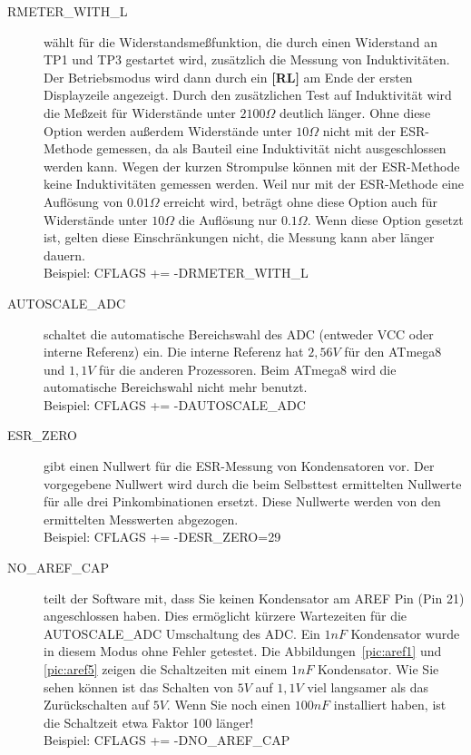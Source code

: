 \begin{description}
  \item[RMETER\_WITH\_L] wählt für die Widerstandsmeßfunktion, die durch einen Widerstand an TP1 und TP3 gestartet wird,
zusätzlich die Messung von Induktivitäten. Der Betriebsmodus wird dann durch ein \textbf{[RL]} am Ende der ersten Displayzeile
angezeigt. Durch den zusätzlichen Test auf Induktivität wird die Meßzeit für Widerstände unter \(2100\Omega\) deutlich
länger. Ohne diese Option werden außerdem Widerstände unter \(10\Omega\) nicht mit der ESR-Methode gemessen,
da als Bauteil eine Induktivität nicht ausgeschlossen werden kann.
Wegen der kurzen Strompulse können mit der ESR-Methode keine Induktivitäten gemessen werden.
Weil nur mit der ESR-Methode eine Auflösung von \(0.01\Omega\) erreicht wird, beträgt ohne diese Option auch für 
Widerstände unter \(10\Omega\) die Auflösung nur \(0.1\Omega\).
Wenn diese Option gesetzt ist, gelten diese Einschränkungen nicht, die Messung kann aber länger dauern.\\
Beispiel: CFLAGS += -DRMETER\_WITH\_L

  \item[AUTOSCALE\_ADC] schaltet die automatische Bereichswahl des ADC (entweder VCC oder interne Referenz) ein.
Die interne Referenz hat \(2,56V\) für den ATmega8 und \(1,1V\) für die anderen Prozessoren.
Beim ATmega8 wird die automatische Bereichswahl nicht mehr benutzt.\\
Beispiel: CFLAGS += -DAUTOSCALE\_ADC

  \item[ESR\_ZERO] gibt einen Nullwert für die ESR-Messung von Kondensatoren vor.
Der vorgegebene Nullwert wird durch die beim Selbsttest ermittelten Nullwerte für alle drei Pinkombinationen ersetzt.
 Diese Nullwerte werden von den ermittelten Messwerten abgezogen.\\
Beispiel: CFLAGS += -DESR\_ZERO=29

  \item[NO\_AREF\_CAP] teilt der Software mit, dass Sie keinen Kondensator am AREF Pin (Pin 21) angeschlossen haben.
Dies ermöglicht kürzere Wartezeiten für die AUTOSCALE\_ADC Umschaltung des ADC.
Ein \(1nF\) Kondensator wurde in diesem Modus ohne Fehler getestet.
Die Abbildungen~\ref{pic:aref1} und \ref{pic:aref5} zeigen die Schaltzeiten mit einem \(1nF\) Kondensator.
Wie Sie sehen können ist das Schalten von \(5V\) auf \(1,1V\) viel langsamer als das Zurückschalten auf \(5V\).
Wenn Sie noch einen \(100nF\) installiert haben, ist die Schaltzeit etwa Faktor 100 länger!\\
Beispiel: CFLAGS += -DNO\_AREF\_CAP

\end{description}

